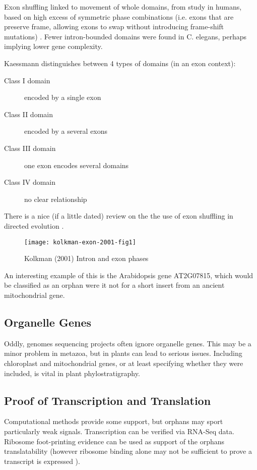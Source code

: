 Exon shuffling linked to movement of whole domains, from study in humans, based
on high excess of symmetric phase combinations (i.e. exons that are preserve
frame, allowing exons to swap without introducing frame-shift mutations)
\cite{kaessmann_signatures_2002}. Fewer intron-bounded domains were found in C.
elegans, perhaps implying lower gene complexity.

Kaessmann distinguishes between 4 types of domains (in an exon context):
\begin{description}
    \item[Class I domain] encoded by a single exon 
    \item[Class II domain] encoded by a several exons
    \item[Class III domain] one exon encodes several domains
    \item[Class IV domain] no clear relationship
\end{description}

There is a nice (if a little dated) review on the the use of exon shuffling in
directed evolution \cite{kolkman_directed_2001}.

\begin{figure}[!hbpt] \centering
    \texttt{[image: kolkman-exon-2001-fig1]}
    \caption{Kolkman (2001) Intron and exon phases \cite{kolkman_directed_2001}}
\end{figure}
\FloatBarrier

An interesting example of this is the Arabidopsis gene AT2G07815, which would
be classified as an orphan were it not for a short insert from an ancient
mitochondrial gene.


\subsection{Organelle Genes}

Oddly, genomes sequencing projects often ignore organelle genes. This may be a
minor problem in metazoa, but in plants can lead to serious issues. Including
chloroplast and mitochondrial genes, or at least specifying whether they were
included, is vital in plant phylostratigraphy.

\subsection{Proof of Transcription and Translation}

Computational methods provide some support, but orphans may sport particularly
weak signals.  Transcription can be verified via RNA-Seq data. Ribosome
foot-printing evidence can be used as support of the orphans translatability
(however ribosome binding alone may not be sufficient to prove a transcript is
expressed \cite{guttman_ribosome_2013}).

